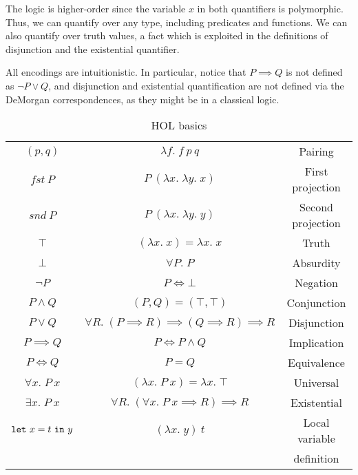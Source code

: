 The logic is higher-order since the variable $x$ in both quantifiers is polymorphic. Thus, we can quantify over any type, including predicates and functions. We can also quantify over truth values, a fact which is exploited in the definitions of disjunction and the existential quantifier.

All encodings are intuitionistic. In particular, notice that \mbox{$P \implies Q$} is not defined as $\neg P \vee Q$, and disjunction and existential quantification are not defined via the DeMorgan correspondences, as they might be in a classical logic.

\begin{table}
\begin{center}
\begin{tabular}{|c|c|c|}
\hline
$(p,q)$          & $\lambda f.\; f\ p\ q$                  & Pairing\\
$fst\ P$         & $P\ (\lambda x.\;\lambda y.\; x)$                & First projection\\
$snd\ P$         & $P\ (\lambda x.\;\lambda y.\; y)$                & Second projection\\
$\top$           & $(\lambda x.\; x) = \lambda x.\; x$       & Truth\\
$\bot$           & $\forall P.\; P$                        & Absurdity\\
$\neg P$         & $P \iff \bot$                            & Negation\\
$P \wedge Q$     & $(P,Q) = (\top,\top)$                 & Conjunction\\
$P \vee Q$       & $\forall R.\; (P \implies R) \implies (Q \implies R) \implies R$  &Disjunction\\
$P \implies Q$   & $P \iff P \wedge Q$                   & Implication\\
$P \iff Q$       & $P = Q$                               & Equivalence\\
$\forall x.\; P\ x$ & $(\lambda x.\; P\ x) = \lambda x.\; \top$ & Universal\\
$\exists x.\; P\ x$ & $\forall R.\; (\forall x.\; P\ x \implies R) \implies R$ & Existential\\
$\code{let}\ x=t\ \code{in}\ y$ & $(\lambda x.\; y)\ t$ & Local variable\\
&& definition\\
\hline
\end{tabular}
\end{center}
\caption{HOL basics}
\label{table:HOL}
\end{table}

